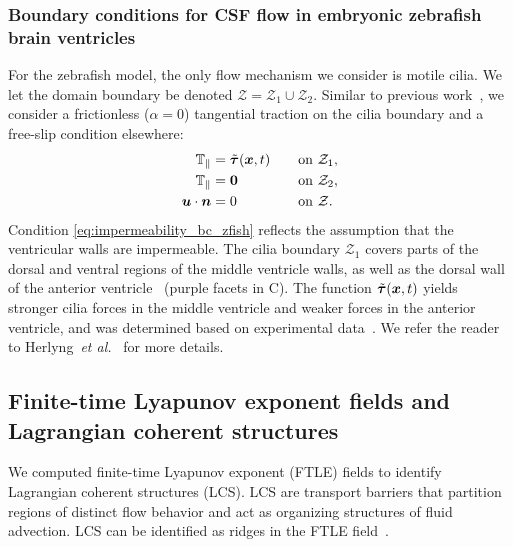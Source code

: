 \documentclass{template}
\begin{document}
\subsubsection{Boundary conditions for CSF flow in embryonic zebrafish brain ventricles}
\label{sec:boundary_conditions_zfish}
For the zebrafish model, the only flow mechanism
we consider is motile cilia. We let the domain boundary be denoted
$\mathcal{Z} = \mathcal{Z}_1\cup\mathcal{Z}_2$.
Similar to previous work~\cite{Herlyng2025AdvectionDiffusion},
we consider a frictionless ($\alpha=0$) 
tangential traction on the cilia boundary
and a free-slip condition elsewhere:
\begin{alignat}{2}
    \mathbb{T}_{\parallel} &= \Tilde{\bm{\tau}}(\bm{x}, t)  &&\quad\text{on }\mathcal{Z}_1, \\
    \mathbb{T}_{\parallel} &= \bm{0} &&\quad\text{on }\mathcal{Z}_2, \\
    \bm{u}\cdot\bm{n} &= 0 &&\quad\text{on }\mathcal{Z}.\label{eq:impermeability_bc_zfish}
\end{alignat}
Condition \eqref{eq:impermeability_bc_zfish} reflects the assumption that the
ventricular walls are impermeable. The cilia
boundary $\mathcal{Z}_1$ covers parts of the dorsal and ventral
regions of the middle ventricle walls, as well as the dorsal wall of the anterior
ventricle~\cite{Olstad2019CiliaryDevelopment} (purple facets in C).
The function $\Tilde{\bm{\tau}}(\bm{x}, t)$ yields stronger cilia forces in the middle ventricle
and weaker forces in the anterior ventricle, and was determined based on
experimental data~\cite{Olstad2019CiliaryDevelopment}. We refer the reader to
Herlyng~\emph{et al.}~\cite{Herlyng2025AdvectionDiffusion} for more details.

\subsection{Finite-time Lyapunov exponent fields and Lagrangian coherent structures}
We computed finite-time Lyapunov exponent (FTLE) fields to
identify Lagrangian coherent structures (LCS).
LCS are transport barriers that partition regions of distinct flow behavior
and act as organizing structures of fluid advection.
LCS can be identified as ridges in the FTLE field~\cite{shadden2005definition}. 
\end{document}

